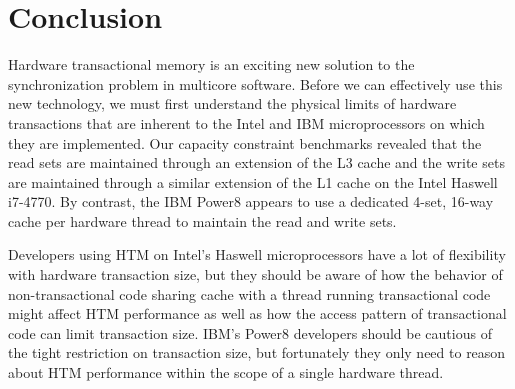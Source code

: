 \section{Conclusion}
Hardware transactional memory is an exciting 
new solution to the synchronization
problem in multicore software. Before we can 
effectively use this new
technology, we must first understand the physical 
limits of hardware
transactions that are inherent to the Intel 
and IBM microprocessors on which
they are implemented. Our capacity constraint 
benchmarks revealed that the read
sets are maintained through an extension of the {L3} cache and the 
write sets are maintained through a similar extension of
the {L1} cache on the Intel Haswell i7-4770.  By contrast, the
IBM Power8 appears to use a dedicated 4-set, 16-way 
cache per hardware thread to maintain the read and
write sets.

Developers using HTM on Intel's Haswell microprocessors have a lot of
flexibility with hardware transaction size, but they 
should be aware of how the
behavior of non-transactional code sharing cache with a thread
running transactional code
might affect HTM performance as well as how the access 
pattern of transactional code can limit transaction size.
IBM's Power8 developers should be cautious of the tight
restriction on transaction size, but fortunately they only 
need to reason about
HTM performance within the scope of a single hardware thread.
 
